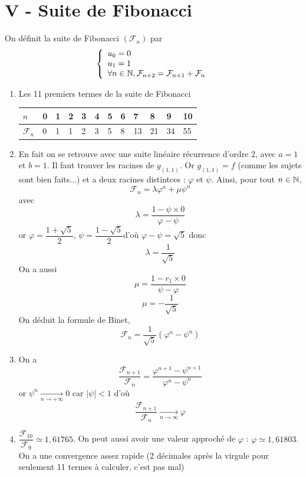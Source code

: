 \section*{V - Suite de Fibonacci}
On définit la suite de Fibonacci $(\mathcal{F}_n)$ par 
$$\left\lbrace \begin{array}{l}
u_0 = 0 \\
u_1 = 1\\
\forall n \in \mathbb{N}, \mathcal{F}_{n+2} = \mathcal{F}_{n+1} + \mathcal{F}_n
\end{array}
\right.$$
\begin{enumerate}
\item Les 11 premiers termes de la suite de Fibonacci
\begin{tabularx}{\linewidth}{|X|X|X|X|X|X|X|X|X|X|X|X|}
\hline 
$n$ & 0 & 1 & 2 & 3 & 4 & 5 & 6 & 7 & 8 & 9 & 10 \\ 
\hline 
$\mathcal{F}_n$ & 0 & 1 & 1 & 2 & 3 & 5 & 8 & 13 & 21 & 34 & 55 \\ 
\hline 
\end{tabularx} 
\item En fait on se retrouve avec une suite linéaire récurrence d'ordre 2, avec $a=1$ et $b=1$. Il faut trouver les racines de $g_{(1,1)}$. Or $g_{(1,1)} = f$ (comme les sujets sont bien faits...) et a deux racines distintces : $\varphi$ et $\psi$. Ainsi, pour tout $n\in \mathbb{N}$, 
$$\mathcal{F}_n = \lambda \varphi^n + \mu \psi^n$$
avec 
$$\lambda = \dfrac{1-\psi\times 0}{\varphi-\psi}$$
or $\varphi = \dfrac{1+\sqrt{5}}{2}$, $\psi = \dfrac{1-\sqrt{5}}{2}$d'où $\varphi - \psi = \sqrt{5}$ donc $$\lambda = \dfrac{1}{\sqrt{5}}$$
On a aussi 
$$\mu = \dfrac{1-r_1\times 0}{\psi-\varphi}$$
$$\mu = -\dfrac{1}{\sqrt{5}}$$
On déduit la formule de Binet, 
$$\mathcal{F}_n = \dfrac{1}{\sqrt{5}}\left(\varphi^n - \psi^n\right)$$
\item On a $$\dfrac{\mathcal{F}_{n+1}}{\mathcal{F}_n} = \dfrac{\varphi^{n+1} - \psi^{n+1}}{\varphi^{n} - \psi^n}$$
or $\psi^n \underset{n\rightarrow +\infty}{\longrightarrow} 0$ car $|\psi| <1$ d'où  $$\dfrac{\mathcal{F}_{n+1}}{\mathcal{F}_n} \underset{n \rightarrow \infty}{\longrightarrow} \varphi$$
\item $\dfrac{\mathcal{F}_{10}}{\mathcal{F}_{9}} \simeq 1,61765$. On peut aussi avoir une valeur approché de $\varphi$ : 
$\varphi \simeq 1,61803$. On a une convergence assez rapide (2 décimales après la virgule pour seulement 11 termes à calculer, c'est pas mal)
\end{enumerate}
